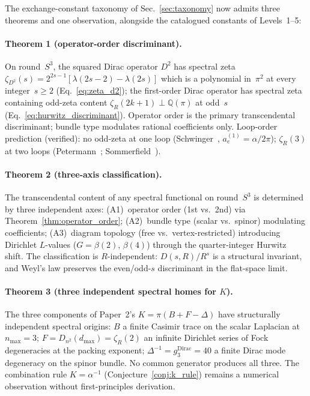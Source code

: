 \documentclass[aps,pra,twocolumn,superscriptaddress,longbibliography]{revtex4-2}
\begin{document}
The exchange-constant taxonomy of Sec.~\ref{sec:taxonomy} now
admits three theorems and one observation, alongside the
catalogued constants of Levels~1--5:

\paragraph{Theorem 1 (operator-order discriminant).}
On round~$S^3$, the squared Dirac operator $D^2$ has spectral zeta
$\zeta_{D^2}(s) = 2^{2s-1}[\lambda(2s{-}2) - \lambda(2s)]$ which is
a polynomial in~$\pi^2$ at every integer~$s \ge 2$
(Eq.~\ref{eq:zeta_d2}); the first-order Dirac operator has
spectral zeta containing odd-zeta content
$\zeta_R(2k{+}1) \perp \mathbb{Q}(\pi)$ at odd~$s$
(Eq.~\ref{eq:hurwitz_discriminant}).  Operator order is the primary
transcendental discriminant; bundle type modulates rational
coefficients only.  Loop-order prediction (verified): no odd-zeta
at one loop (Schwinger~\cite{schwinger1948}, $a_e^{(1)} = \alpha/2\pi$);
$\zeta_R(3)$ at two loops (Petermann~\cite{petermann1957};
Sommerfield~\cite{sommerfield1957}).

\paragraph{Theorem 2 (three-axis classification).}
The transcendental content of any spectral functional on round~$S^3$
is determined by three independent axes:
(A1)~operator order (1st vs.\ 2nd) via Theorem~\ref{thm:operator_order};
(A2)~bundle type (scalar vs.\ spinor) modulating coefficients;
(A3)~diagram topology (free vs.\ vertex-restricted) introducing
Dirichlet $L$-values ($G = \beta(2)$, $\beta(4)$) through the
quarter-integer Hurwitz shift.  The classification is $R$-independent:
$D(s,R)/R^s$ is a structural invariant, and Weyl's law preserves the
even/odd-$s$ discriminant in the flat-space limit.

\paragraph{Theorem 3 (three independent spectral homes for $K$).}
The three components of Paper~2's $K = \pi(B + F - \Delta)$ have
structurally independent spectral origins:
$B$ a finite Casimir trace on the scalar Laplacian at $n_{\max}=3$;
$F = D_{n^2}(d_{\max}) = \zeta_R(2)$ an infinite Dirichlet series
of Fock degeneracies at the packing exponent;
$\Delta^{-1} = g_3^{\mathrm{Dirac}} = 40$ a finite Dirac mode
degeneracy on the spinor bundle.  No common generator produces all
three.  The combination rule $K = \alpha^{-1}$
(Conjecture~\ref{conj:k_rule}) remains a numerical observation
without first-principles derivation.
\end{document}
